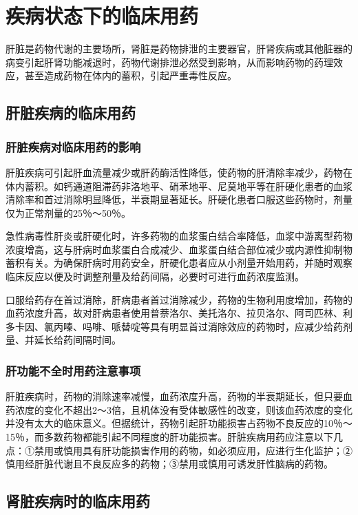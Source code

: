\section{疾病状态下的临床用药}

肝脏是药物代谢的主要场所，肾脏是药物排泄的主要器官，肝肾疾病或其他脏器的病变引起肝肾功能减退时，药物代谢排泄必然受到影响，从而影响药物的药理效应，甚至造成药物在体内的蓄积，引起严重毒性反应。

\subsection{肝脏疾病的临床用药}

\subsubsection{肝脏疾病对临床用药的影响}

肝脏疾病可引起肝血流量减少或肝药酶活性降低，使药物的肝清除率减少，药物在体内蓄积。如钙通道阻滞药非洛地平、硝苯地平、尼莫地平等在肝硬化患者的血浆清除率和首过消除明显降低，半衰期显著延长。肝硬化患者口服这些药物时，剂量仅为正常剂量的25％～50％。

急性病毒性肝炎或肝硬化时，许多药物的血浆蛋白结合率降低，血浆中游离型药物浓度增高，这与肝病时血浆蛋白合成减少、血浆蛋白结合部位减少或内源性抑制物蓄积有关。为确保肝病时用药安全，肝硬化患者应从小剂量开始用药，并随时观察临床反应以便及时调整剂量及给药间隔，必要时可进行血药浓度监测。

口服给药存在首过消除，肝病患者首过消除减少，药物的生物利用度增加，药物的血药浓度升高，故对肝病患者使用普萘洛尔、美托洛尔、拉贝洛尔、阿司匹林、利多卡因、氯丙嗪、吗啡、哌替啶等具有明显首过消除效应的药物时，应减少给药剂量、并延长给药间隔时间。

\subsubsection{肝功能不全时用药注意事项}

肝脏疾病时，药物的消除速率减慢，血药浓度升高，药物的半衰期延长，但只要血药浓度的变化不超出2～3倍，且机体没有受体敏感性的改变，则该血药浓度的变化并没有太大的临床意义。但据统计，药物引起肝功能损害占药物不良反应的10％～15％，而多数药物都能引起不同程度的肝功能损害。肝脏疾病用药应注意以下几点：①禁用或慎用具有肝功能损害作用的药物，如必须应用，应进行生化监护；②慎用经肝脏代谢且不良反应多的药物；③禁用或慎用可诱发肝性脑病的药物。

\subsection{肾脏疾病时的临床用药}

